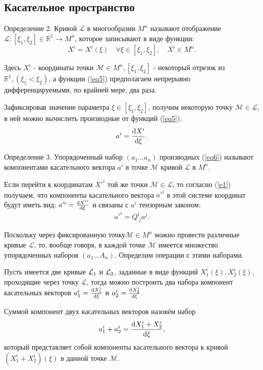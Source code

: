 \documentclass[14pt,a4paper]{scrartcl}
\begin{document}
\subsection{Касательное пространство}
Определение 2. Кривой $\mathcal{L}$ в многообразии $M^n$ называют отображение $\mathcal{L}: [\xi_1,\xi_2] \in \mathbb{R}^1 \longrightarrow M^n$, которое записывают в виде функции:
\begin{equation}\label{eq5}
	X^i = X^i(\xi) \quad \forall \xi \in [\xi_1, \xi_2], \quad X^i \in M^n.	
\end{equation}

Здесь $X^i$ - координаты точки $\mathcal{M} \in M^n, [\xi_1, \xi_2]$ - некоторый отрезок из $\mathbb{R}^1, (\xi_1 < \xi_2)$, а функции (\ref{eq5}) предполагаем непрерывно дифференцируемыми, по крайней мере, два раза.


Зафиксировав значение параметра $\xi \in [\xi_1,\xi_2]$, получим некоторую точку $\mathcal{M} \in \mathcal{L}$, в ней можно вычислить производные от функций (\ref{eq5}):
\begin{equation}\label{eq6}
	a^i = \dv{X^i}{\xi}.
\end{equation}

Определение 3. Упорядоченный набор $(a_1\dots a_n)$ производных (\ref{eq6}) называют компонентами касательного вектора $a^i$ в точке $\mathcal{M}$ кривой $\mathcal{L}$ в $ M^n $.

Если перейти к координатам $X'^i$ той же точки $\mathcal{M} \in \mathcal{L}$, то согласно (\ref{e1}) получаем, что компоненты касательного вектора $a'^i$ в этой системе координат будут иметь вид: $a'^i = \dv{X'^i}{\xi}$ и связаны с $a^i$ тензорным законом:
\begin{equation}\label{eq7}
	a'^i = Q_{\; j}^i a^j.
\end{equation}

Поскольку через фиксированную точку$\mathcal{M} \in M^n$ можно провести различные кривые $\mathcal{L}$, то, вообще говоря, в каждой точке $\mathcal{M}$ имеется множество упорядоченных наборов $(a_1\dots A_n)$. Определим операции с этими наборами.

Пусть имеется две кривые $\mathcal{L_\textup{1}}$ и $\mathcal{L_\textup{2}}$, заданные в виде функций $X_1^i(\xi), X_2^i(\xi)$, проходящие через точку $\mathcal{L}$, тогда можно построить два набора компонент касательных векторов $a_1^i = \dv{X_1^i}{\xi}$ и $a_2^i = \dv{X_2^i}{\xi}$.

Суммой компонент двух касательных векторов назовём набор
\begin{equation}\label{eq8}
	a_1^i + a_2^i = \dv{X_1^i + X_2^i}{\xi},
\end{equation}
который представляет собой компоненты касательного вектора к кривой $(X_1^i + X_2^i)(\xi)$ в данной точке $\mathcal{M}$.
\end{document}
